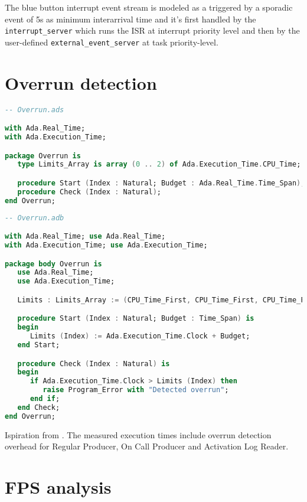 \documentclass{article}
\begin{document}
The blue button interrupt event stream is modeled as a triggered by a sporadic event of 5s as minimum interarrival time and it's first handled by the \texttt{interrupt\_server} which runs the ISR at interrupt priority level and then by the user-defined \texttt{external\_event\_server} at task priority-level.

\section{Overrun detection}

\begin{lstlisting}[language=Ada]
-- Overrun.ads

with Ada.Real_Time;
with Ada.Execution_Time;

package Overrun is
   type Limits_Array is array (0 .. 2) of Ada.Execution_Time.CPU_Time;

   procedure Start (Index : Natural; Budget : Ada.Real_Time.Time_Span);
   procedure Check (Index : Natural);
end Overrun;
\end{lstlisting}

\begin{lstlisting}[language=Ada]
-- Overrun.adb

with Ada.Real_Time; use Ada.Real_Time;
with Ada.Execution_Time; use Ada.Execution_Time;

package body Overrun is
   use Ada.Real_Time;
   use Ada.Execution_Time;

   Limits : Limits_Array := (CPU_Time_First, CPU_Time_First, CPU_Time_First);

   procedure Start (Index : Natural; Budget : Time_Span) is
   begin
      Limits (Index) := Ada.Execution_Time.Clock + Budget;
   end Start;

   procedure Check (Index : Natural) is
   begin
      if Ada.Execution_Time.Clock > Limits (Index) then
         raise Program_Error with "Detected overrun";
      end if;
   end Check;
end Overrun;
\end{lstlisting}

Ispiration from \cite{overrundetection}. The measured execution times include overrun detection overhead for Regular Producer, On Call Producer and Activation Log Reader.

\section{FPS analysis}
\end{document}

